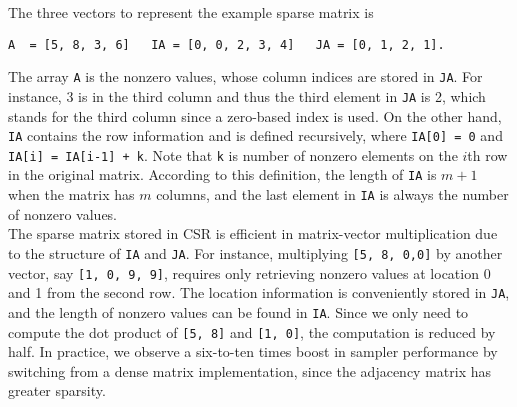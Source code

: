 \noindent The three vectors to represent the example sparse matrix is 
\begin{verbatim}
A  = [5, 8, 3, 6]   IA = [0, 0, 2, 3, 4]   JA = [0, 1, 2, 1].
\end{verbatim} 

The array \texttt{A} is the nonzero values, whose column indices are stored in  \texttt{JA}.
For instance, 3 is in the third column and thus the third element in \texttt{JA}  is 2, which stands for the third column since a zero-based index is used.
On the other hand, \texttt{IA}  contains the row information and is defined recursively, where  \texttt{IA[0] = 0}  and  \texttt{IA[i] = IA[i-1] + k}.
Note that \texttt{k} is  number of nonzero elements on the $i$th row in the original matrix.
According to this definition, the length of \texttt{IA} is $m + 1$ when the matrix has $ m $ columns, and the last element in \texttt{IA} is always the number of nonzero values.\\

The sparse matrix stored in CSR is efficient in matrix-vector multiplication due to the structure of \texttt{IA} and \texttt{JA}.
For instance, multiplying \texttt{[5, 8, 0,0]} by another vector, say \texttt{[1, 0, 9, 9]}, requires only retrieving nonzero values at location 0 and 1 from the second row.
The location information is conveniently stored in \texttt{JA}, and the length of nonzero values can be found in \texttt{IA}.
 Since we only need to compute the dot product of \texttt{[5, 8]} and \texttt{[1, 0]}, the computation is reduced by half.
  In practice, we observe a six-to-ten times boost in sampler performance by switching from a dense matrix implementation, since the adjacency matrix has greater sparsity.


